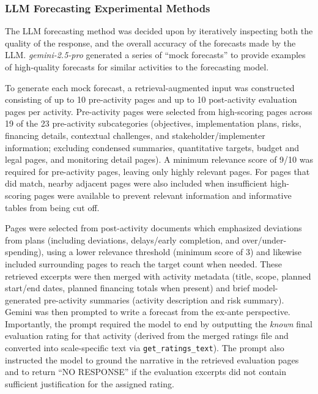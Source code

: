 \documentclass[12pt,a4paper]{article}
\begin{document}
\subsubsection{LLM Forecasting Experimental Methods} \label{ssub:experimental_methods}

The LLM forecasting method was decided upon by iteratively inspecting both the quality of the response, and the overall accuracy of the forecasts made by the LLM. \emph{gemini-2.5-pro} generated a series of ``mock forecasts'' to provide examples of high-quality forecasts for similar activities to the forecasting model.

To generate each mock forecast, a retrieval-augmented input was constructed consisting of up to 10 pre-activity pages and up to 10 post-activity evaluation pages per activity. Pre-activity pages were selected from high-scoring pages across 19 of the 23 pre-activity subcategories (objectives, implementation plans, risks, financing details, contextual challenges, and stakeholder/implementer information; excluding condensed summaries, quantitative targets, budget and legal pages, and monitoring detail pages). A minimum relevance score of 9/10 was required for pre-activity pages, leaving only highly relevant pages. For pages that did match, nearby adjacent pages were also included when insufficient high-scoring pages were available to prevent relevant information and informative tables from being cut off.

Pages were selected from post-activity documents which emphasized deviations from plans (including deviations, delays/early completion, and over/under-spending), using a lower relevance threshold (minimum score of 3) and likewise included surrounding pages to reach the target count when needed. These retrieved excerpts were then merged with activity metadata (title, scope, planned start/end dates, planned financing totals when present) and brief model-generated pre-activity summaries (activity description and risk summary). Gemini was then prompted to write a forecast from the ex-ante perspective. Importantly, the prompt required the model to end by outputting the \emph{known} final evaluation rating for that activity (derived from the merged ratings file and converted into scale-specific text via \texttt{get\_ratings\_text}). The prompt also instructed the model to ground the narrative in the retrieved evaluation pages and to return ``NO RESPONSE'' if the evaluation excerpts did not contain sufficient justification for the assigned rating.
\end{document}
